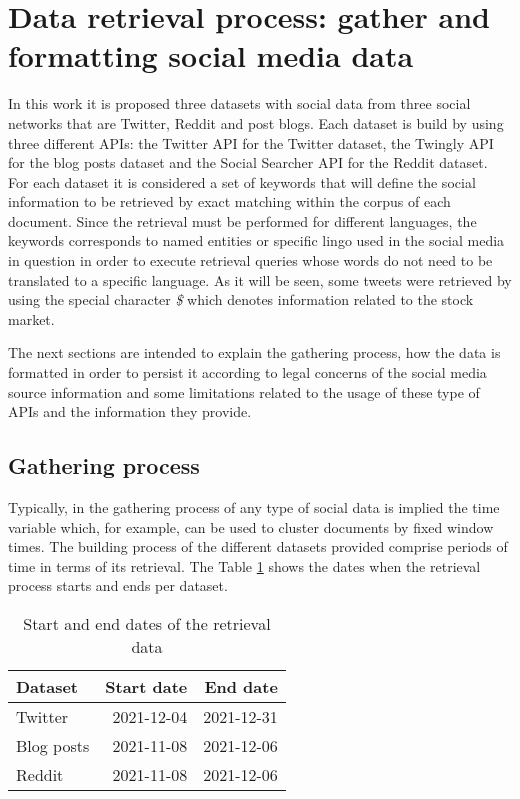 \section{Data retrieval process: gather and formatting social media data}

In this work it is proposed three datasets with social data from three social networks that are Twitter, Reddit and post blogs. Each dataset is build by using three different APIs: the Twitter API for the Twitter dataset, the Twingly API for the blog posts dataset and the Social Searcher API for the Reddit dataset. For each dataset it is considered a set of keywords that will define the social information to be retrieved by exact matching within the corpus of each document. Since the retrieval must be performed for different languages, the keywords corresponds to named entities or specific lingo used in the social media in question in order to execute retrieval queries whose words do not need to be translated to a specific language. As it will be seen, some tweets were retrieved by using the special character \textit{\$} which denotes information related to the stock market.

\par The next sections are intended to explain the gathering process, how the data is formatted in order to persist it according to legal concerns of the social media source information and some limitations related to the usage of these type of APIs and the information they provide.
\subsection{Gathering process}
Typically, in the gathering process of any type of social data is implied the time variable which, for example,  can be used to cluster documents by fixed window times. The building process of the different datasets provided comprise periods of time in terms of its retrieval. The Table \ref{table:periodTime} shows the dates when the retrieval process starts and ends per dataset.

\begin{table}[htb]
	\begin{center}
		\begin{tabular}{|l|r|r|}
			\hline
			\textbf{Dataset} &    \textbf{Start date } &\textbf{ End date}\\
			\hline \hline
			Twitter              &  2021-12-04  &  2021-12-31\\ 
			\hline
			Blog posts &  2021-11-08 	& 2021-12-06 \\
			\hline
			Reddit &  2021-11-08   	& 2021-12-06 \\
			\hline
		\end{tabular}
	\end{center}
	\caption{Start and end dates of the retrieval data}
	\label{table:periodTime}
\end{table}

